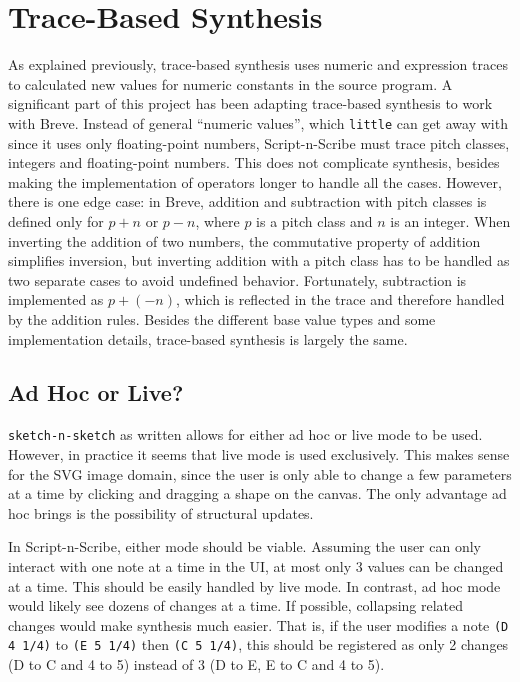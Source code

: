 \documentclass[nocopyrightspace,numbers,10pt]{sigplanconf}
\newcommand{\sketch}{\texttt{sketch-n-sketch}}
\newcommand{\lil}{\texttt{little}}
\newcommand{\sns}{Script-n-Scribe}
\begin{document}
\section{Trace-Based Synthesis}
\label{sec:tbs}

As explained previously, trace-based synthesis uses numeric and expression
traces to calculated new values for numeric constants in the source program. A
significant part of this project has been adapting trace-based synthesis to work
with Breve. Instead of general ``numeric values'', which \lil{} can get away
with since it uses only floating-point numbers, \sns{} must trace pitch classes,
integers and floating-point numbers. This does not complicate synthesis, besides
making the implementation of operators longer to handle all the cases. However,
there is one edge case: in Breve, addition and subtraction with pitch classes is
defined only for $p + n$ or $p - n$, where $p$ is a pitch class and $n$ is an
integer. When inverting the addition of two numbers, the commutative property of
addition simplifies inversion, but inverting addition with a pitch class has to
be handled as two separate cases to avoid undefined behavior. Fortunately,
subtraction is implemented as $p + (-n)$, which is reflected in the trace and
therefore handled by the addition rules.  Besides the different base value types
and some implementation details, trace-based synthesis is largely the same.

\subsection{Ad Hoc or Live?}
\label{sub:tbs:comp}

\sketch{} as written allows for either ad hoc or live mode to be used. However,
in practice it seems that live mode is used exclusively. This makes sense for
the SVG image domain, since the user is only able to change a few parameters at
a time by clicking and dragging a shape on the canvas. The only advantage ad hoc
brings is the possibility of structural updates.

In \sns{}, either mode should be viable. Assuming the user can only
interact with one note at a time in the UI, at most only 3 values can be changed
at a time. This should be easily handled by live mode. In contrast, ad hoc mode
would likely see dozens of changes at a time. If possible, collapsing related
changes would make synthesis much easier. That is, if the user modifies a note
\texttt{(D 4 1/4)} to \texttt{(E 5 1/4)} then \texttt{(C 5 1/4)}, this should be
registered as only 2 changes (D to C and 4 to 5) instead of 3 (D to E, E to C
and 4 to 5).
\end{document}
